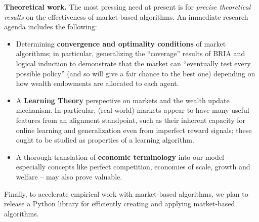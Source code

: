 \textbf{Theoretical work.} The most pressing need at present is for \emph{precise theoretical results} on the effectiveness of market-based algorithms. An immediate research agenda includes the following:

\begin{itemize}
  \item Determining \textbf{convergence and optimality conditions} of market algorithms; in particular, generalizing the ``coverage'' results of BRIA \cite{oesterheldTheoryBoundedInductive2023} and logical induction \cite{garrabrantLogicalInduction2020} to demonstrate that the market can ``eventually test every possible policy'' (and so will give a fair chance to the best one) depending on how wealth endowments are allocated to each agent.
  \item A \textbf{Learning Theory} perspective on markets and the wealth update mechanism. In particular, (real-world) markets appear to have many useful features from an alignment standpoint, such as their inherent capacity for online learning and generalization even from imperfect reward signals; these ought to be studied as properties of a learning algorithm. %
  \item A thorough translation of \textbf{economic terminology} into our model -- especially concepts like perfect competition, economies of scale, growth and welfare -- may also prove valuable.
\end{itemize}

Finally, to accelerate empirical work with market-based algorithms, we plan to release a Python library for efficiently creating and applying market-based algorithms.







